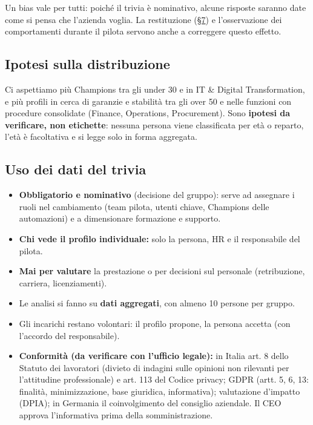 \documentclass[11pt,a4paper]{article}
\begin{document}
Un bias vale per tutti: poiché il trivia è nominativo, alcune risposte saranno date come si pensa che l'azienda voglia. La restituzione (\hyperref[sec:7]{\S7}) e l'osservazione dei comportamenti durante il pilota servono anche a correggere questo effetto.

\subsection{Ipotesi sulla distribuzione}\label{sec:5.5}
Ci aspettiamo più Champions tra gli under 30 e in IT \& Digital Transformation, e più profili in cerca di garanzie e stabilità tra gli over 50 e nelle funzioni con procedure consolidate (Finance, Operations, Procurement). Sono \textbf{ipotesi da verificare, non etichette}: nessuna persona viene classificata per età o reparto, l'età è facoltativa e si legge solo in forma aggregata.

\subsection{Uso dei dati del trivia}\label{sec:5.6}
\begin{itemize}
\item \textbf{Obbligatorio e nominativo} (decisione del gruppo): serve ad assegnare i ruoli nel cambiamento (team pilota, utenti chiave, Champions delle automazioni) e a dimensionare formazione e supporto.
\item \textbf{Chi vede il profilo individuale:} solo la persona, HR e il responsabile del pilota.
\item \textbf{Mai per valutare} la prestazione o per decisioni sul personale (retribuzione, carriera, licenziamenti).
\item Le analisi si fanno su \textbf{dati aggregati}, con almeno 10 persone per gruppo.
\item Gli incarichi restano volontari: il profilo propone, la persona accetta (con l'accordo del responsabile).
\item \textbf{Conformità (da verificare con l'ufficio legale):} in Italia art. 8 dello Statuto dei lavoratori (divieto di indagini sulle opinioni non rilevanti per l'attitudine professionale) e art. 113 del Codice privacy; GDPR (artt. 5, 6, 13: finalità, minimizzazione, base giuridica, informativa); valutazione d'impatto (DPIA); in Germania il coinvolgimento del consiglio aziendale. Il CEO approva l'informativa prima della somministrazione.
\end{itemize}
\end{document}
